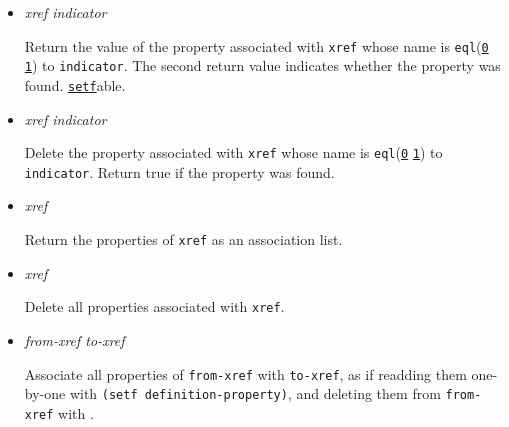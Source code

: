 \begin{itemize}
\item
  \label{x-28DREF-EXT-3ADEFINITION-PROPERTY-20FUNCTION-29}
  \emph{xref indicator}

  Return the value of the property associated with \texttt{xref} whose
  name is
  \texttt{eql}(\href{http://www.lispworks.com/documentation/HyperSpec/Body/f_eql.htm}{\texttt{0}}
  \href{http://www.lispworks.com/documentation/HyperSpec/Body/t_eql.htm}{\texttt{1}})
  to \texttt{indicator}. The second return value indicates whether the
  property was found.
  \href{http://www.lispworks.com/documentation/HyperSpec/Body/m_setf_.htm}{\texttt{setf}}able.
\item
  \label{x-28DREF-EXT-3ADELETE-DEFINITION-PROPERTY-20FUNCTION-29}
  \emph{xref indicator}

  Delete the property associated with \texttt{xref} whose name is
  \texttt{eql}(\href{http://www.lispworks.com/documentation/HyperSpec/Body/f_eql.htm}{\texttt{0}}
  \href{http://www.lispworks.com/documentation/HyperSpec/Body/t_eql.htm}{\texttt{1}})
  to \texttt{indicator}. Return true if the property was found.
\item
  \label{x-28DREF-EXT-3ADEFINITION-PROPERTIES-20FUNCTION-29}
  \emph{xref}

  Return the properties of \texttt{xref} as an association list.
\item
  \label{x-28DREF-EXT-3ADELETE-DEFINITION-PROPERTIES-20FUNCTION-29}
  \emph{xref}

  Delete all properties associated with \texttt{xref}.
\item
  \label{x-28DREF-EXT-3AMOVE-DEFINITION-PROPERTIES-20FUNCTION-29}
  \emph{from-xref to-xref}

  Associate all properties of \texttt{from-xref} with \texttt{to-xref},
  as if readding them one-by-one with
  \texttt{(setf\ definition-property)}, and deleting them from
  \texttt{from-xref} with
  .
\end{itemize}

